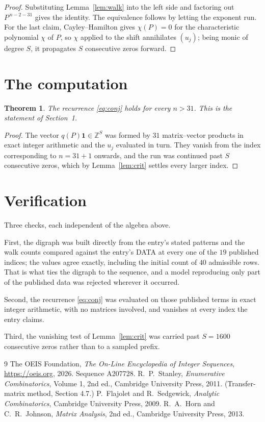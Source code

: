 \documentclass[11pt,a4paper]{article}
\theoremstyle{plain}
\newtheorem{theorem}{Theorem}
\theoremstyle{definition}
\begin{document}
\begin{proof}
Substituting Lemma~\ref{lem:walk} into the left side and factoring out
$P^{\,n-2-31}$ gives the identity. The equivalence follows by letting the exponent
run. For the last claim, Cayley--Hamilton gives $\chi(P)=0$ for the characteristic
polynomial $\chi$ of $P$, so $\chi$ applied to the shift annihilates $(u_j)$; being monic of
degree $S$, it propagates $S$ consecutive zeros forward.
\end{proof}

\section{The computation}

\begin{theorem}
The recurrence \eqref{eq:conj} holds for every $n>31$. This is the statement of
Section~1.
\end{theorem}

\begin{proof}
The vector $q(P)\mathbf{1}\in\mathbb{Z}^{S}$ was formed by $31$ matrix--vector
products in exact integer arithmetic and the $u_j$ evaluated in turn. They vanish from the
index corresponding to $n=31+1$ onwards, and the run was continued past $S$ consecutive
zeros, which by Lemma~\ref{lem:crit} settles every larger index.
\end{proof}

\section{Verification}

Three checks, each independent of the algebra above.

First, the digraph was built directly from the entry's stated patterns and the walk counts
compared against the entry's DATA at every one of the $19$ published indices; the
values agree exactly, including the initial count of $40$ admissible rows. That is
what ties the digraph to the sequence, and a model reproducing only part of the published
data was rejected wherever it occurred.

Second, the recurrence \eqref{eq:conj} was evaluated on those published terms in exact
integer arithmetic, with no matrices involved, and vanishes at every index the entry claims.

Third, the vanishing test of Lemma~\ref{lem:crit} was carried past $S=1600$ consecutive
zeros rather than to a sampled prefix.

\begin{thebibliography}{9}
 The OEIS Foundation, \emph{The On-Line Encyclopedia of Integer
Sequences}, \url{https://oeis.org}, 2026. Sequence A207728.
 R.~P.~Stanley, \emph{Enumerative Combinatorics}, Volume 1, 2nd ed.,
Cambridge University Press, 2011. (Transfer-matrix method, Section 4.7.)
 P.~Flajolet and R.~Sedgewick, \emph{Analytic Combinatorics}, Cambridge
University Press, 2009.
 R.~A.~Horn and C.~R.~Johnson, \emph{Matrix Analysis}, 2nd ed., Cambridge
University Press, 2013.
\end{thebibliography}
\end{document}
